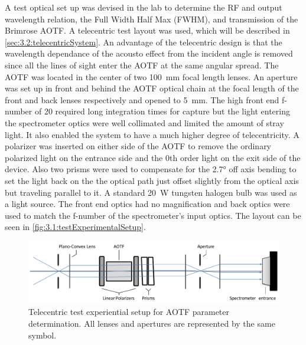 A test optical set up was devised in the lab to determine the RF and output wavelength relation, the Full Width Half Max (FWHM), and transmission of the Brimrose AOTF. A telecentric test layout was used, which will be described in \autoref{sec:3.2:telecentricSystem}. An advantage of the telecentric design is that the wavelength dependance of the acousto effect from the incident angle is removed since all the lines of sight enter the AOTF at the same angular spread. The AOTF was located in the center of two 100~mm focal length lenses. An aperture was set up in front and behind the AOTF optical chain at the focal length of the front and back lenses respectively and opened to 5~mm. The high front end f-number of 20 required long integration times for capture but the light entering the spectrometer optics were well collimated and limited the amount of stray light. It also enabled the system to have a much higher degree of telecentricity. A polarizer was inserted on either side of the AOTF to remove the ordinary polarized light on the entrance side and the 0th order light on the exit side of the device. Also two prisms were used to compensate for the 2.7\si{\degree} off axis bending to set the light back on the the optical path just offset slightly from the optical axis but traveling parallel to it. A standard 20~W tungsten halogen bulb was used as a light source. The front end optics had no magnification and back optics were used to match the f-number of the spectrometer's input optics. The layout can be seen in \autoref{fig:3.1:testExperimentalSetup}.

\begin{figure}[h!]
    \includegraphics[width=1.0\textwidth]{./Images/3-1-TestExperimentalSetUp.pdf}
    \caption[AOTF Calibration Experimental Setup]{Telecentric test experiential setup for AOTF parameter determination. All lenses and apertures are represented by the same symbol.}
    \label{fig:3.1:testExperimentalSetup}
\end{figure}


